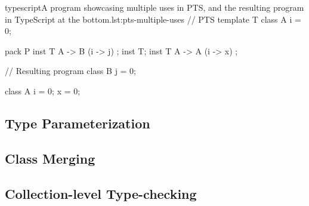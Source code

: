 \begin{code}{typescript}{A program showcasing multiple uses in PTS, and the resulting program in TypeScript at the bottom.}{lst:pts-multiple-uses}
    // PTS
    template T {
        class A {
            i = 0;
        }
    }

    pack P {
        inst T { A -> B (i -> j) };
        inst T;
        inst T { A -> A (i -> x) };
    }

    // Resulting program
    class B {
        j = 0;
    }

    class A {
        i = 0;
        x = 0;
    }
\end{code}

\subsection{Type Parameterization}

\subsection{Class Merging}

\subsection{Collection-level Type-checking}\label{subsec:implementation-collection-level-type-checking}

